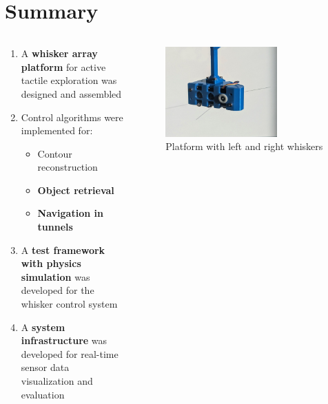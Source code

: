 \section{Summary}
\begin{columns}[T,onlytextwidth]
    \begin{column}[T]{0.6\textwidth}
        \begin{enumerate}
            \item A \textbf{whisker array platform} for active tactile exploration was designed and assembled
            \item Control algorithms were implemented for:
            \begin{itemize}
                \item Contour reconstruction
                \item \textbf{Object retrieval}
                \item \textbf{Navigation in tunnels}
            \end{itemize}
            \item A \textbf{test framework with physics simulation} was developed for the whisker control system
            \item A \textbf{system infrastructure} was developed for real-time sensor data visualization and evaluation
        \end{enumerate}
    \end{column}
    \begin{column}[T]{0.4\textwidth}
        \begin{figure}[H]
            \centering
            \captionsetup{justification=centering}
            \includegraphics[width=0.7\textwidth]{figures/platform-two-whiskers}
            \caption{Platform with left and right whiskers}
        \end{figure}

\end{column}
\end{columns}
